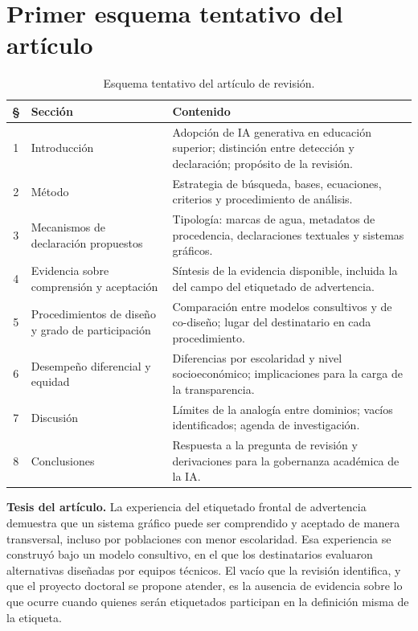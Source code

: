 \documentclass[letter,12pt]{article}
\begin{document}
\section{Primer esquema tentativo del artículo}\label{sec:esquema}

\begin{table}[H]
\centering
\footnotesize
\caption{Esquema tentativo del artículo de revisión.}
\label{tab:esquema}
\renewcommand{\arraystretch}{1.35}
\begin{tabular}{|c|p{4.6cm}|p{6.4cm}|}
\hline
\rowcolor{bgCotejo}
\textbf{\S} & \textbf{Sección} & \textbf{Contenido} \\
\hline
1 & Introducción & Adopción de IA generativa en educación superior; distinción entre detección y declaración; propósito de la revisión. \\
\hline
2 & Método & Estrategia de búsqueda, bases, ecuaciones, criterios y procedimiento de análisis. \\
\hline
3 & Mecanismos de declaración propuestos & Tipología: marcas de agua, metadatos de procedencia, declaraciones textuales y sistemas gráficos. \\
\hline
4 & Evidencia sobre comprensión y aceptación & Síntesis de la evidencia disponible, incluida la del campo del etiquetado de advertencia. \\
\hline
5 & Procedimientos de diseño y grado de participación & Comparación entre modelos consultivos y de co-diseño; lugar del destinatario en cada procedimiento. \\
\hline
6 & Desempeño diferencial y equidad & Diferencias por escolaridad y nivel socioeconómico; implicaciones para la carga de la transparencia. \\
\hline
7 & Discusión & Límites de la analogía entre dominios; vacíos identificados; agenda de investigación. \\
\hline
8 & Conclusiones & Respuesta a la pregunta de revisión y derivaciones para la gobernanza académica de la IA. \\
\hline
\end{tabular}
\end{table}

\noindent\textbf{Tesis del artículo.} La experiencia del etiquetado frontal de advertencia demuestra que un sistema gráfico puede ser comprendido y aceptado de manera transversal, incluso por poblaciones con menor escolaridad. Esa experiencia se construyó bajo un modelo consultivo, en el que los destinatarios evaluaron alternativas diseñadas por equipos técnicos. El vacío que la revisión identifica, y que el proyecto doctoral se propone atender, es la ausencia de evidencia sobre lo que ocurre cuando quienes serán etiquetados participan en la definición misma de la etiqueta.
\end{document}
